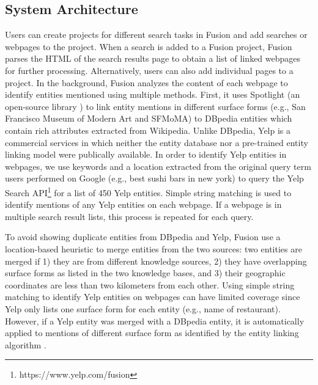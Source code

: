 \subsection{System Architecture}
Users can create projects for different search tasks in Fusion and add searches or webpages to the project. When a search is added to a Fusion project, Fusion parses the HTML of the search results page to obtain a list of linked webpages for further processing. Alternatively, users can also add individual pages to a project. In the background, Fusion analyzes the content of each webpage to identify entities mentioned using multiple methods. First, it uses Spotlight (an open-source library \cite{spotlight}) to link entity mentions in different surface forms (e.g., San Francisco Museum of Modern Art and SFMoMA) to DBpedia entities which contain rich attributes extracted from Wikipedia. Unlike DBpedia, Yelp is a commercial services in which neither the entity database nor a pre-trained entity linking model were publically available. In order to identify Yelp entities in webpages, we use keywords and a location extracted from the original query term users performed on Google (e.g., best sushi bars in new york) to query the Yelp Search API\footnote{https://www.yelp.com/fusion} for a list of 450 Yelp entities. Simple string matching is used to identify mentions of any Yelp entities on each webpage. If a webpage is in multiple search result lists, this process is repeated for each query. 

To avoid showing duplicate entities from DBpedia and Yelp, Fusion use a location-based heuristic to merge entities from the two sources: two entities are merged if 1) they are from different knowledge sources, 2) they have overlapping surface forms as listed in the two knowledge bases, and 3) their geographic coordinates are less than two kilometers from each other. Using simple string matching to identify Yelp entities on webpages can have limited coverage since Yelp only lists one surface form for each entity (e.g., name of restaurant). However, if a Yelp entity was merged with a DBpedia entity, it is automatically applied to mentions of different surface form as identified by the entity linking algorithm \cite{spotlight}.

